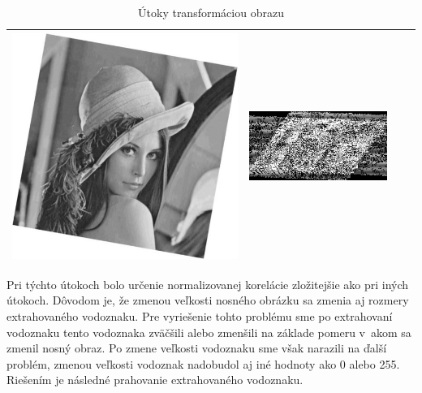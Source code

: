 \begin{table}[h]
\begin{tabular}{llcc}
\begin{minipage}[c]{.1\textwidth}
  \includegraphics[scale=0.1]{obrazky/rotation10}
\end{minipage}
 &
 \begin{minipage}[c]{.15\textwidth}
   \includegraphics[scale=0.25]{obrazky/rotation10-wm}
 \end{minipage} \\ \hline
\end{tabular}
\caption{Útoky transformáciou obrazu}
\end{table}

Pri týchto útokoch bolo určenie normalizovanej korelácie zložitejšie ako pri iných útokoch. Dôvodom je, že zmenou veľkosti nosného obrázku sa zmenia aj rozmery extrahovaného vodoznaku. Pre vyriešenie tohto problému sme po extrahovaní vodoznaku tento vodoznaka zväčšili alebo zmenšili na základe pomeru v~akom sa zmenil nosný obraz. Po zmene veľkosti vodoznaku sme však narazili na ďalší problém, zmenou veľkosti vodoznak nadobudol aj iné hodnoty ako 0 alebo 255. Riešením je následné prahovanie extrahovaného vodoznaku.

